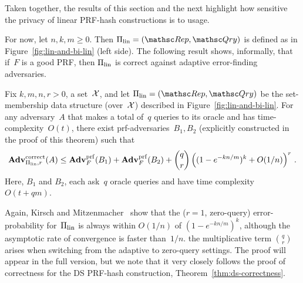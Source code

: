 Taken together, the results of this section and the next highlight how sensitive the privacy of linear PRF-hash constructions is to usage.


For now, let $n,k,m \geq 0$.  Then $\setprim_{\mathrm{lin}}= (\Rep, \Qry)$ is defined as in Figure~\ref{fig:lin-and-bi-lin} (left side).  The following result shows, informally, that if~$F$ is a good PRF, then $\Pi_{\mathrm{lin}}$ is correct against adaptive error-finding adversaries.

\begin{theorem}\label{thm1}\label{thm:lin-correctness}
Fix $k,m,n,r>0$, a set~${\cal X}$, and let $\setprim_{\mathrm{lin}}= (\Rep, \Qry)$ be the set-membership data structure (over~${\cal X}$) described in Figure~\ref{fig:lin-and-bi-lin}.  For any adversary~$A$ that makes a total of~$q$ queries to its oracle and has time-complexity~$O(t)$, there exist prf-adversaries~$B_1,B_2$ (explicitly constructed in the proof of this theorem) such that
\[
\mathrm{\mathbf{Adv}}^{\mathrm{correct}}_{\Pi_{\mathrm{lin}},r}(A) \leq  \mathbf{Adv}^{\mathrm{prf}}_{F}(B_1) + \mathbf{Adv}^{\mathrm{prf}}_{F}(B_2)  +{\dbinom{q}{r}} \left( (1-e^{-kn/m})^k + O(1/n) \right)^r\,.
\]
Here, $B_1$ and $B_2$, each ask~$q$ oracle queries and have time complexity~$O(t+qm)$.
\end{theorem}
Again, Kirsch and Mitzenmacher~\cite{kirsch2006less} show
that the ($r=1$, zero-query) error-probability for~$\Pi_\mathrm{lin}$ is
always within $O(1/n)$ of $(1-e^{-kn/m})^k$, although the asymptotic
rate of convergence is faster than~$1/n$.
the multiplicative term $\binom{q}{r}$ arises when switching from the adaptive to zero-query settings.
The proof will appear in the full version, but we note that it very
closely follows the proof of correctness for the DS PRF-hash
construction, Theorem~\ref{thm:ds-correctness}.
%


